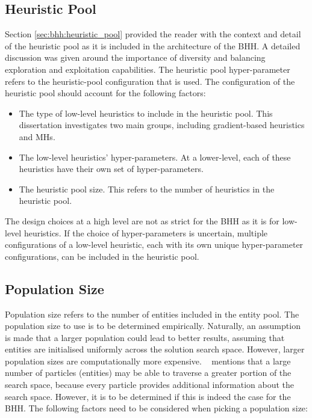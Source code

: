 \subsection{Heuristic Pool}\label{sec:bhh:hyper_parameters:heuristic_pool}

Section \ref{sec:bhh:heuristic_pool} provided the reader with the context and detail of the heuristic pool as it is included in the architecture of the \acs{BHH}. A detailed discussion was given around the importance of diversity and balancing exploration and exploitation capabilities. The heuristic pool hyper-parameter refers to the heuristic-pool configuration that is used. The configuration of the heuristic pool should account for the following factors:

\begin{itemize}
      \item The type of low-level heuristics to include in the heuristic pool. This dissertation investigates two main groups, including gradient-based heuristics and \acp{MH}.

      \item The low-level heuristics' hyper-parameters. At a lower-level, each of these heuristics have their own set of hyper-parameters.

      \item The heuristic pool size. This refers to the number of heuristics in the heuristic pool.
\end{itemize}

The design choices at a high level are not as strict for the \acs{BHH} as it is for low-level heuristics. If the choice of hyper-parameters is uncertain, multiple configurations of a low-level heuristic, each with its own unique hyper-parameter configurations, can be included in the heuristic pool.

\subsection{Population Size}\label{sec:bhh:hyper_parameters:population_size}

Population size refers to the number of entities included in the entity pool. The population size to use is to be determined empirically. Naturally, an assumption is made that a larger population could lead to better results, assuming that entities are initialised uniformly across the solution search space. However, larger population sizes are computationally more expensive. \citeauthor{ref:oldewage:2017}~\cite{ref:oldewage:2017} mentions that a large number of particles (entities) may be able to traverse a greater portion of the search space, because every particle provides additional information about the search space. However, it is to be determined if this is indeed the case for the \acs{BHH}. The following factors need to be considered when picking a population size:

